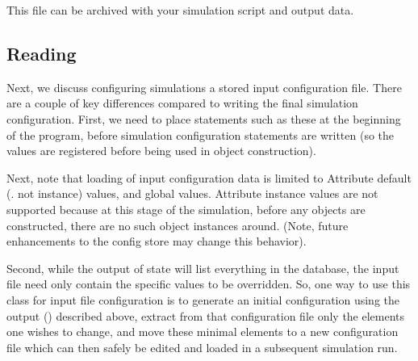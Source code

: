 \documentclass[letterpaper,10pt,english]{sphinxmanual}
\renewcommand{\sphinxcode}[1]{\texttt{\small{#1}}}
\begin{document}
This file can be archived with your simulation script and output data.


\subsection{Reading}
\label{\detokenize{attributes:reading}}
Next, we discuss configuring simulations  a stored input
configuration file.  There are a couple of key differences
compared to writing the final simulation configuration.  First, we
need to place statements such as these at the beginning of the program,
before simulation configuration statements are written (so the values
are registered before being used in object construction).

\begin{sphinxVerbatim}[commandchars=\\\{\}]
   
   
   
 
 
\end{sphinxVerbatim}

Next, note that loading of input configuration data is limited to Attribute
default (. not instance) values, and global values.  Attribute instance
values are not supported because at this stage of the simulation, before
any objects are constructed, there are no such object instances around.
(Note, future enhancements to the config store may change this behavior).

Second, while the output of \sphinxcode{} state
will list everything in the database, the input file need only contain
the specific values to be overridden.  So, one way to use this class
for input file configuration is to generate an initial configuration
using the output (\sphinxcode{}) \sphinxcode{} described above, extract from
that configuration file only the elements one wishes to change,
and move these minimal elements to a new configuration file
which can then safely be edited and loaded in a subsequent simulation run.
\end{document}
